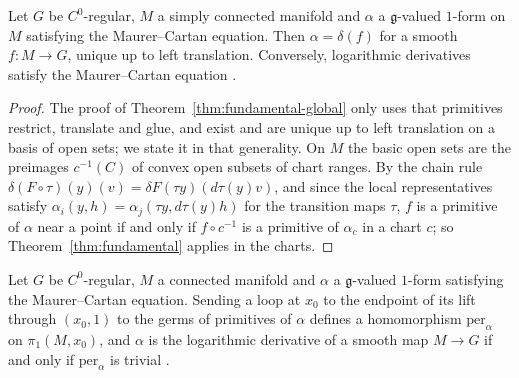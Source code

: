\begin{theorem}
  \label{thm:fundamental-manifold}
  \leanok
  Let $G$ be $C^0$-regular, $M$ a simply connected manifold and $\alpha$ a $\mathfrak g$-valued
  $1$-form on $M$ satisfying the Maurer--Cartan equation. Then $\alpha = \delta(f)$ for a smooth
  $f \colon M \to G$, unique up to left translation. Conversely, logarithmic derivatives satisfy the
  Maurer--Cartan equation \cite[Theorem 6.1.13 (i), (ii)(a)]{GN26}.
\end{theorem}

\begin{proof}
  \leanok
  The proof of Theorem~\ref{thm:fundamental-global} only uses that primitives restrict, translate
  and glue, and exist and are unique up to left translation on a basis of open sets; we state it in
  that generality. On $M$ the basic open sets are the preimages $c^{-1}(C)$ of convex open subsets
  of chart ranges. By the chain rule $\delta(F \circ \tau)(y)(v) = \delta F(\tau y)(d\tau(y) v)$,
  and since the local representatives satisfy $\alpha_i(y, h) = \alpha_j(\tau y, d\tau(y) h)$ for
  the transition maps $\tau$, $f$ is a primitive of $\alpha$ near a point if and only if
  $f \circ c^{-1}$ is a primitive of $\alpha_c$ in a chart $c$; so
  Theorem~\ref{thm:fundamental} applies in the charts.
\end{proof}

\begin{theorem}
  \label{thm:period-map}
  \leanok
  Let $G$ be $C^0$-regular, $M$ a connected manifold and $\alpha$ a $\mathfrak g$-valued $1$-form
  satisfying the Maurer--Cartan equation. Sending a loop at $x_0$ to the endpoint of its lift
  through $(x_0, 1)$ to the germs of primitives of $\alpha$ defines a homomorphism
  $\mathrm{per}_\alpha$ on $\pi_1(M, x_0)$, and $\alpha$ is the logarithmic derivative of a smooth
  map $M \to G$ if and only if $\mathrm{per}_\alpha$ is trivial
  \cite[Definition 6.1.12, Theorem 6.1.13(ii)(b)]{GN26}.
\end{theorem}

